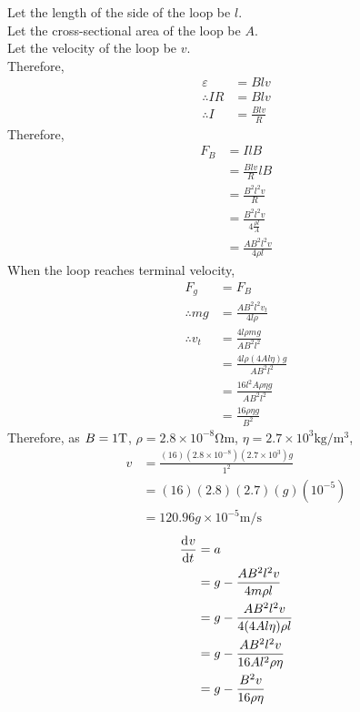 \documentclass[fleqn, a4paper, 8pt, twoside]{amsart}
\theoremstyle{definition}
\theoremstyle{theorem}
\begin{document}
\begin{multicols}{2}
\begin{spacing}{0.6}
\begin{solution}
	Let the length of the side of the loop be $l$.\\
	Let the cross-sectional area of the loop be $A$.\\
	Let the velocity of the loop be $v$.\\
	Therefore,
	\begin{align*}
		\varepsilon &= B l v\\
		\therefore I R &= B l v\\
		\therefore I &= \frac{B l v}{R}
	\end{align*}
	Therefore,
	\begin{align*}
		F_B &= I l B\\
		&= \frac{B l v}{R} l B\\
		&= \frac{B^2 l^2 v}{R}\\
		&= \frac{B^2 l^2 v}{4 \frac{\rho l}{A}}\\
		&= \frac{A B^2 l^2 v}{4 \rho l}
	\end{align*}
	When the loop reaches terminal velocity,
	\begin{align*}
		F_g &= F_B\\
		\therefore m g &= \frac{A B^2 l^2 v_t}{4 l \rho}\\
		\therefore v_t &= \frac{4 l \rho m g}{A B^2 l^2}\\
		&= \frac{4 l \rho (4 A l \eta) g }{A B^2 l^2}\\
		&= \frac{16 l^2 A \rho \eta g}{A B^2 l^2}\\
		&= \frac{16 \rho \eta g}{B^2}
	\end{align*}
	Therefore, as $B = 1 \tesla$, $\rho = 2.8 \times 10^{-8} \si{\ohm\metre}$, $\eta = 2.7 \times 10^3 \si{\kg\per\metre\cubed}$,\\
	\begin{align*}
		v &= \frac{(16) \left( 2.8 \times 10^{-8} \right) \left( 2.7 \times 10^3 \right) g}{1^2}\\
		&= (16) (2.8) (2.7) (g) \left( 10^{-5} \right)\\
		&= 120.96 g \times 10^{-5} \si{\metre\per\second}
	\end{align*}
	\begin{align*}
		\dod{v}{t} &= a\\
		&= g - \frac{A B^2 l^2 v}{4 m \rho l}\\
		&= g - \frac{A B^2 l^2 v}{4 (4 A l \eta) \rho l}\\
		&= g - \frac{A B^2 l^2 v}{ 16 A l^2 \rho \eta}\\
		&= g - \frac{B^2 v}{16 \rho \eta}\\

\end{align*}
\end{solution}
\end{spacing}
\end{multicols}
\end{document}
